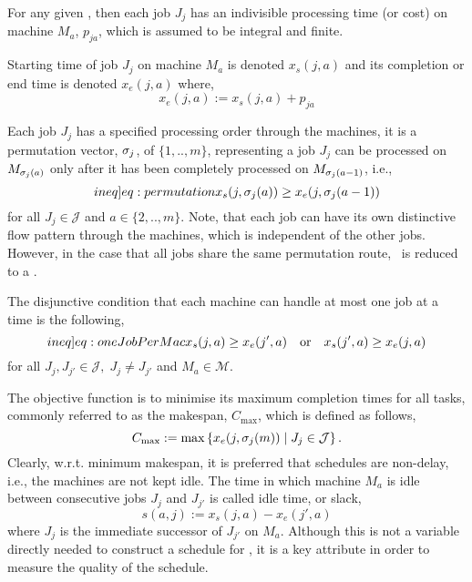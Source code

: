For any given \JSP, then each job $J_j$ has an indivisible processing time (or 
cost) on machine $M_a$, $p_{ja}$, which is assumed to be integral and finite. 

Starting time of job $J_j$ on machine $M_a$ is denoted $x_s(j,a)$ and its 
completion or end time is denoted $x_e(j,a)$ where, 
\begin{equation}  x_e(j,a):=x_s(j,a)+p_{ja} \end{equation} 


Each job $J_j$ has a specified processing order through the machines, it is a 
permutation vector, ${\mathbf{\sigma}}_j$, of $\{1,..,m\}$, representing a job $J_j$ can 
be processed on $M_{{\mathbf{\sigma}}_j(a)}$ only after it has been completely processed 
on $M_{{\mathbf{\sigma}}_j(a-1)}$, i.e.,
\begin{equation}\label[ineq]{eq:permutation}
x_s(j,\vsigma_j(a)) \geq x_e(j,\vsigma_j(a-1)) 
\end{equation}
for all $J_j\in\mathcal{J}$ and $a\in\{2,..,m\}$. 
Note, that each job can have its own distinctive flow pattern through the 
machines, which is independent of the other jobs. However, in the case that all 
jobs share the same permutation route, \JSP\ is reduced to a \FSP.

The disjunctive condition that each machine can handle at most one job at a 
time is the following,
\begin{equation}\label[ineq]{eq:oneJobPerMac}
x_s(j,a) \geq x_e(j',a) \quad\textrm{or}\quad x_s(j',a) \geq x_e(j,a)  
\end{equation}
for all $J_j,J_{j'}\in\mathcal{J},\; J_j\neq J_{j'}$ and $M_a\in\mathcal{M}$. 

The objective function is to minimise its maximum completion times for all 
tasks, commonly referred to as the makespan, $C_{\max}$, which is defined as 
follows,
\begin{equation}
C_{\max} := \max\condset{x_e(j,\vsigma_j(m))}{J_j\in\mathcal{J}}.
\label{eq:makespan}
\end{equation} 
Clearly, w.r.t. minimum makespan, it is preferred that schedules are non-delay, 
i.e., the machines are not kept idle. The time in which machine $M_a$ is idle 
between consecutive jobs $J_j$ and $J_{j'}$ is called idle time, or slack,
\begin{equation} 
s(a,j):=x_s(j,a)-x_e(j',a) \label{eq:slack}
\end{equation}
where $J_j$ is the immediate successor of $J_{j'}$ on $M_a$. Although this is 
not a variable directly needed to construct a schedule for \JSP, it is a key 
attribute in order to measure the quality of the schedule. 

